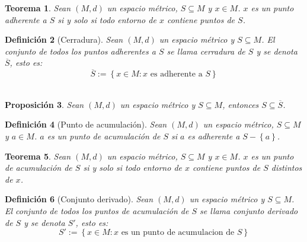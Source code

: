 \documentclass[oneside]{book} %
\theoremstyle{Teorema}
\newtheorem{Definicion}{Definición}[chapter]
\newtheorem{Teorema}[Definicion]{Teorema}
\newtheorem{Proposicion}[Definicion]{Proposición}
\theoremstyle{Ejemplos}
\theoremstyle{[Obs]}
\renewcommand{\{}{\left\lbrace} %
\renewcommand{\}}{\right\rbrace} %
\renewcommand{\sc}{\subseteq} %
\begin{document}
			\begin{Teorema}
				
				Sean $(M, d)$ un espacio métrico, $S \sc M$ y $x \in M$. $x$ es un punto adherente a $S$ si y solo si todo entorno de $x$ contiene puntos de $S$. \\

			\end{Teorema}

			\begin{Definicion}[Cerradura]
				
				Sean $(M, d)$ un espacio métrico y $S \sc M$. El conjunto de todos los puntos adherentes a $S$ se llama cerradura de $S$ y se denota $\overline{S}$, esto es: \\

				\[ \overline{S} := \{ x \in M : x \text{ es adherente a } S \} \] \\

			\end{Definicion}

			\begin{Proposicion}
				
				Sean $(M, d)$ un espacio métrico y $S \sc M$, entonces $S \sc \overline{S}$. \\

			\end{Proposicion}

			\begin{Definicion}[Punto de acumulación]
				
				Sean $(M, d)$ un espacio métrico, $S \sc M$ y $a \in M$. $a$ es un punto de acumulación de $S$ si $a$ es adherente a $S - \{ a \}$. \\ 

			\end{Definicion}

			\begin{Teorema}
				
				Sean $(M, d)$ un espacio métrico, $S \sc M$ y $x \in M$. $x$ es un punto de acumulación de $S$ si y solo si todo entorno de $x$ contiene puntos de $S$ distintos de $x$. \\

			\end{Teorema}

			\begin{Definicion}[Conjunto derivado]
				
				Sean $(M, d)$ un espacio métrico y $S \sc M$. El conjunto de todos los puntos de acumulación de $S$ se llama conjunto derivado de $S$ y se denota $S'$, esto es: \\

				\[ S' := \{ x \in M : x \text{ es un punto de acumulacion de } S \} \] \\

			\end{Definicion}
\end{document}

